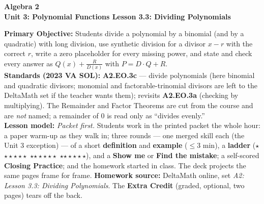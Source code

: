 \documentclass[10pt]{article}
\newcommand{\CourseName}{Algebra 2}
\newcommand{\UnitNumberName}{Unit 3: Polynomial Functions \quad}
\newcommand{\LessonNumberName}{Lesson 3.3: Dividing Polynomials}
\newcommand{\rung}[1]{{\color{goldacc}\ifcase#1\or$\star$\or$\star\star$\or$\star\star\star$\fi}}
\begin{document}
\begin{center}
    {\Large\bfseries \CourseName \\
    {\small\bfseries \UnitNumberName \LessonNumberName}}
\end{center}

\begin{tcolorbox}[colback=forestbg, colframe=forest, boxrule=0.9pt, arc=2mm,
    left=2mm, right=2mm, top=1.5mm, bottom=1.5mm]
    \textbf{Primary Objective:} Students divide a polynomial by a binomial (and by a quadratic)
    with long division, use synthetic division for a divisor $x - r$ with the correct $r$, write
    a zero placeholder for every missing power, and state and check every answer as
    $Q(x) + \frac{R}{D(x)}$ with $P = D\cdot Q + R$.
    \\[2pt]
    \textbf{Standards (2023 VA SOL):} \textbf{A2.EO.3c} --- divide polynomials (here binomial
    and quadratic divisors; monomial and factorable-trinomial divisors are left to the DeltaMath
    set if the teacher wants them); revisits \textbf{A2.EO.3a} (checking by multiplying).
    The Remainder and Factor Theorems are cut from the course and are \emph{not} named; a
    remainder of $0$ is read only as ``divides evenly.''
    \\[2pt]
    \textbf{Lesson model:} \emph{Packet first.} Students work in the printed packet the whole
    hour: a paper warm-up as they walk in; three rounds --- one merged skill each (the Unit 3
    exception) --- of a short \textbf{definition} and \textbf{example} ($\le$3 min), a
    \textbf{ladder} (\rung1\ \rung2\ \rung3), and a \textbf{Show me} or \textbf{Find the
    mistake}; a self-scored \textbf{Closing Practice}; and the homework started in class. The deck
    projects the same pages frame for frame. \textbf{Homework source:} DeltaMath online, set
    \emph{A2: Lesson 3.3: Dividing Polynomials}. The \textbf{Extra Credit} (graded, optional,
    two pages) tears off the back.
\end{tcolorbox}
\end{document}
